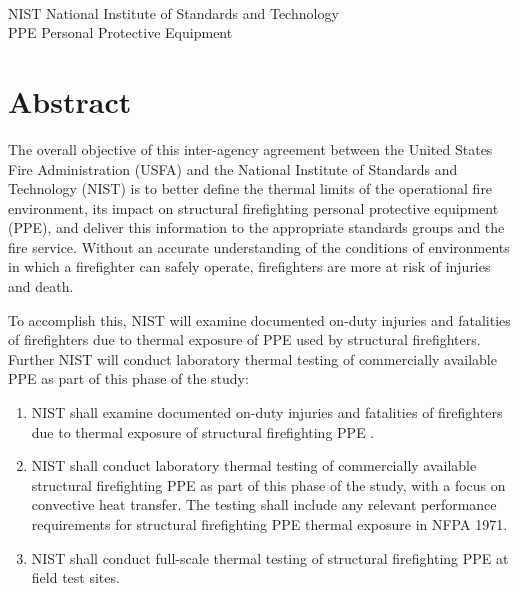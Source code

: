 \documentclass[12pt,oneside]{book}
\begin{document}
\begin{tabbing}
\hspace{1.5in} \= \\
NIST \> National Institute of Standards and Technology \\
PPE \> Personal Protective Equipment \\
\end{tabbing}

\mainmatter

\chapter*{\centering Abstract}
The overall objective of this inter-agency agreement between the United States Fire Administration (USFA) and the National Institute of Standards and Technology (NIST) is to better define the thermal limits of the operational fire environment, its impact on structural firefighting personal protective equipment (PPE), and deliver this information to the appropriate standards groups and the fire service. Without an accurate understanding of the conditions of environments in which a firefighter can safely operate, firefighters are more at risk of injuries and death.

To accomplish this, NIST will examine documented on-duty injuries and fatalities of firefighters due to thermal exposure of PPE used by structural firefighters. Further NIST will conduct laboratory thermal testing of commercially available PPE as part of this phase of the study:
\begin{enumerate}
\item NIST shall examine documented on-duty injuries and fatalities of firefighters due to thermal exposure of structural firefighting PPE \cite{Weinschenk:Chicago,Overholt:San_Francisco,Weinschenk:PGCounty}.
\item NIST shall conduct laboratory thermal testing of commercially available structural firefighting PPE as part of this phase of the study, with a focus on convective heat transfer. The testing shall include any relevant performance requirements for structural firefighting PPE thermal exposure in NFPA 1971.
\item NIST shall conduct full-scale thermal testing of structural firefighting PPE at field test sites.
\end{enumerate}
\end{document}
